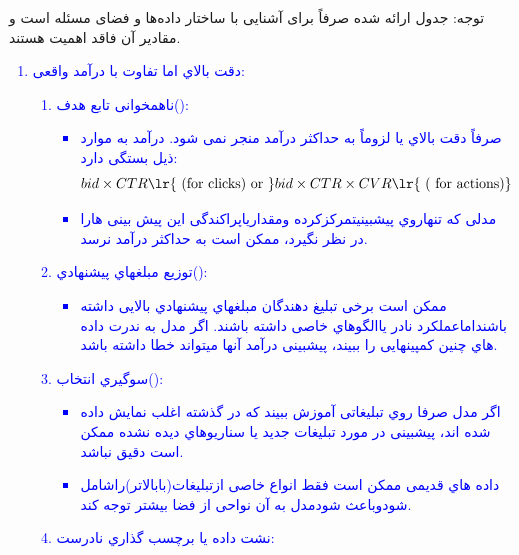 \documentclass[12pt]{article}
\begin{document}
\begin{enumerate}
    توجه: جدول ارائه شده صرفاً برای آشنایی با ساختار داده‌ها و فضای مسئله است و مقادیر آن فاقد اهمیت هستند.
    \textcolor{blue}{
    \begin{enumerate}
        \item دقت بالاي  اما تفاوت با درآمد واقعی:\\
        \begin{enumerate}
            \item ناهمخوانی تابع هدف():\\
            \begin{itemize}
                \item صرفاً دقت بالاي  یا  لزوماً به حداکثر درآمد منجر نمی شود. درآمد به موارد ذیل بستگی
                دارد:
                $$
                bid \times CTR \text{\lr{  (for clicks) or }} bid \times CTR\times CVR \text{\lr{ ( for actions)}}
                $$
                \item مدلی که تنهاروي پیشبینیتمرکزکرده ومقداریاپراکندگی این پیش بینی هارا
                در نظر نگیرد، ممکن است به حداکثر درآمد نرسد. 
            \end{itemize}
            \item توزیع مبلغهاي پیشنهادي():\\
            \begin{itemize}
                \item ممکن است برخی تبلیغ دهندگان مبلغهاي پیشنهادي بالایی داشته باشنداماعملکرد نادر یاالگوهاي خاصی
                داشته باشند. اگر مدل به ندرت داده هاي چنین کمپینهایی را ببیند، پیشبینی درآمد آنها میتواند خطا
                 داشته باشد.
            \end{itemize}
            \item سوگیري انتخاب():
            \begin{itemize}
                \item اگر مدل صرفا روي تبلیغاتی آموزش ببیند که در گذشته اغلب نمایش داده شده اند، پیشبینی در مورد
                تبلیغات جدید یا سناریوهاي دیده نشده ممکن است دقیق نباشد.
                \item داده هاي قدیمی ممکن است فقط انواع خاصی ازتبلیغات(بابالاتر)راشامل شودوباعث شودمدل
                به آن نواحی از فضا بیشتر توجه کند.
            \end{itemize}
            \item نشت داده یا برچسب گذاري نادرست:
            \begin{itemize}

\end{itemize}
\end{enumerate}
\end{enumerate}}
\end{enumerate}
\end{document}
